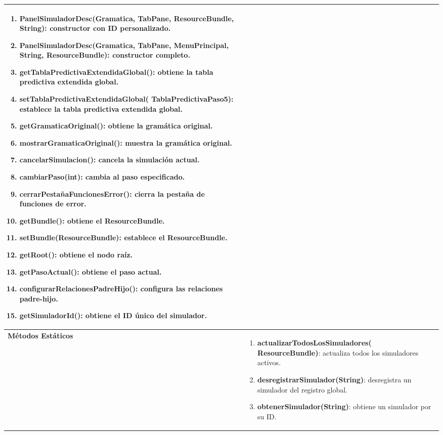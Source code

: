 \begin{longtable}[H]{|>{\columncolor[rgb]{0.63,0.79,0.95}}m{6cm} | m{8.5cm} |}
\begin{enumerate}
    \item \textbf{PanelSimuladorDesc(Gramatica, TabPane, ResourceBundle, String)}: constructor con ID personalizado.
    \item \textbf{PanelSimuladorDesc(Gramatica, TabPane, MenuPrincipal, String, ResourceBundle)}: constructor completo.
    \item \textbf{getTablaPredictivaExtendidaGlobal()}: obtiene la tabla predictiva extendida global.
    \item \textbf{setTablaPredictivaExtendidaGlobal( TablaPredictivaPaso5)}: establece la tabla predictiva extendida global.
    \item \textbf{getGramaticaOriginal()}: obtiene la gramática original.
    \item \textbf{mostrarGramaticaOriginal()}: muestra la gramática original.
    \item \textbf{cancelarSimulacion()}: cancela la simulación actual.
    \item \textbf{cambiarPaso(int)}: cambia al paso especificado.
    \item \textbf{cerrarPestañaFuncionesError()}: cierra la pestaña de funciones de error.
    \item \textbf{getBundle()}: obtiene el ResourceBundle.
    \item \textbf{setBundle(ResourceBundle)}: establece el ResourceBundle.
    \item \textbf{getRoot()}: obtiene el nodo raíz.
    \item \textbf{getPasoActual()}: obtiene el paso actual.
    \item \textbf{configurarRelacionesPadreHijo()}: configura las relaciones padre-hijo.
    \item \textbf{getSimuladorId()}: obtiene el ID único del simulador.
\end{enumerate} \\ \hline
\textbf{Métodos Estáticos} &
\begin{enumerate}
    \item \textbf{actualizarTodosLosSimuladores( ResourceBundle)}: actualiza todos los simuladores activos.
    \item \textbf{desregistrarSimulador(String)}: desregistra un simulador del registro global.
    \item \textbf{obtenerSimulador(String)}: obtiene un simulador por su ID.
\end{enumerate}
\label{tabla_panel_simulador_desc}
\end{longtable}

